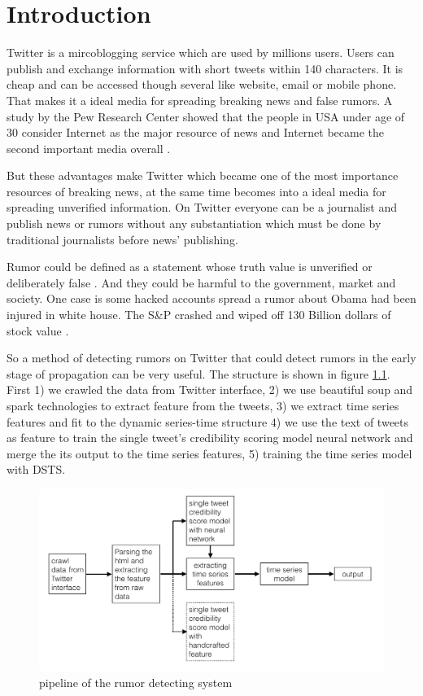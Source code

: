 \chapter{Introduction} %
\label{cha:introduction}
Twitter is a mircoblogging service which are used by millions users. Users can publish and exchange information with short tweets within 140 characters. It is cheap and can be accessed though several like website, email or mobile phone. That makes it a ideal media for spreading breaking news and false rumors.  A study by the Pew Research Center showed that the people in USA under age of 30 consider Internet as the major resource of news and Internet became the second important media overall \cite{kohut2008internet}.

But these advantages make Twitter which became one of the most importance resources of breaking news, at the same time becomes into a ideal media for spreading unverified information. On Twitter everyone can be a journalist and publish news or rumors without any substantiation which must be done by traditional journalists before news' publishing. 

 Rumor could be defined as a statement whose truth value is unverified or deliberately false \cite{qazvinian2011rumor}. And they could be harmful to the government, market and society. One case is some hacked accounts spread a rumor about Obama had been injured in white house. The S\&P crashed and wiped off 130 Billion dollars of stock value \cite{matthews2013does}. 
 
 So a method of detecting rumors on Twitter that could detect rumors in the early stage of propagation can be very useful.    
 The structure is shown in figure \ref{fig:pipeline}. First 1) we crawled the data from Twitter interface, 2) we use beautiful soup and spark technologies to extract feature from the tweets, 3) we extract time series features and fit to the dynamic series-time structure 4) we use the text of tweets as feature to train the single tweet's credibility scoring model neural network and merge the its output to the time series features, 5) training the time series model with DSTS.  
 
 \begin{figure}[!h]
\centering
\includegraphics[width=0.7\columnwidth]{images/structuremodel.png}
\caption{ pipeline of the rumor detecting system }
\label{fig:pipeline}
\end{figure}

